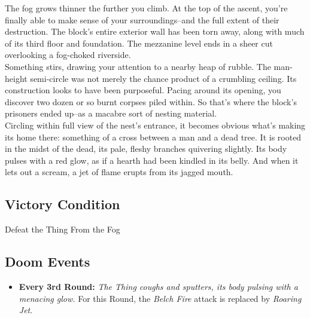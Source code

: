 The fog grows thinner the further you climb. At the top of the ascent, you’re finally able to make sense of your surroundings--and the full extent of their destruction. The block's entire exterior wall has been torn away, along with much of its third floor and foundation. The mezzanine level ends in a sheer cut overlooking a fog-choked riverside.\\

Something stirs, drawing your attention to a nearby heap of rubble. The man-height semi-circle was not merely the chance product of a crumbling ceiling. Its construction looks to have been purposeful. Pacing around its opening, you discover two dozen or so burnt corpses piled within. So that's where the block's prisoners ended up--as a macabre sort of nesting material.\\


Circling within full view of the nest's entrance, it becomes obvious what’s making its home there: something of a cross between a man and a dead tree. It is rooted in the midst of the dead, its pale, fleshy branches quivering slightly. Its body pulses with a red glow, as if a hearth had been kindled in its belly. And when it lets out a scream, a jet of flame erupts from its jagged mouth.

\subsection*{Victory Condition}
Defeat the Thing From the Fog

\begin{tcolorbox}
\subsection*{Doom Events}
\begin{itemize}
\item \textbf{Every 3rd Round:} \emph{The Thing coughs and sputters, its body pulsing with a menacing glow.} For this Round, the \emph{Belch Fire} attack is replaced by \emph{Roaring Jet}.
\end{itemize}
\end{tcolorbox}

